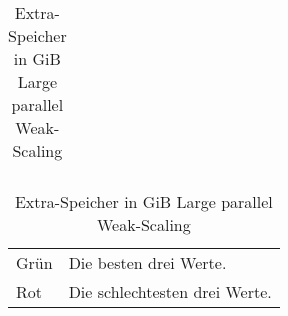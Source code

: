 \begin{table}[h]
{\begin{tabular}{lrrrrrrrrrrrrrrrrrrrrr}
\bottomrule
\end{tabular}
}
\caption{Extra-Speicher in GiB Large parallel Weak-Scaling}
\label{messung:tab:memory-large-par-weak}
\begin{tabular}{ll}
{\color{green}Grün} & Die besten drei Werte.\\
{\color{red}Rot} & Die schlechtesten drei Werte.\\
\end{tabular}
\end{table}
